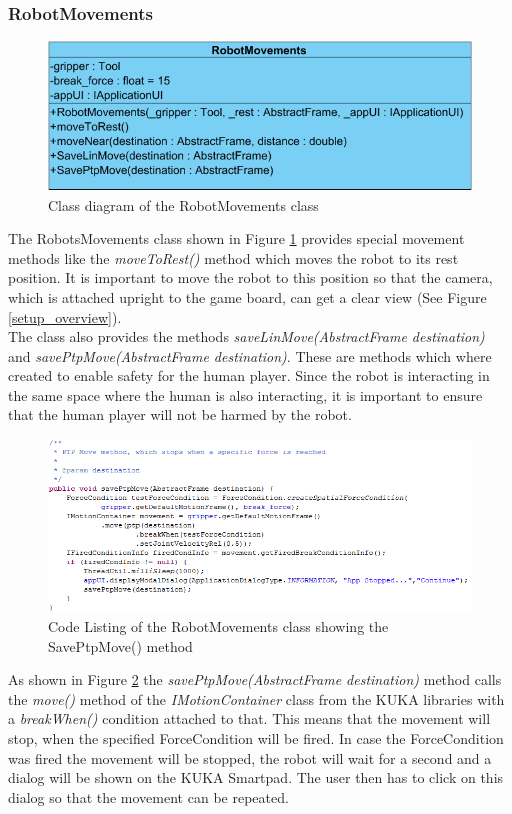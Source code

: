 \documentclass[a4paper]{spie}  %
\begin{document}
\begin{large}
\subsubsection{RobotMovements}
\begin{figure}[h]
\includegraphics[width=12cm]{images/class_roboMov.png}
\centering
\caption{Class diagram of the RobotMovements class}
\label{class_roboMov}
\end{figure}
The RobotsMovements class shown in Figure \ref{class_roboMov} provides special movement methods like the \emph{moveToRest()} method which moves the robot to its rest position. It is important to move the robot to this position so that the camera, which is attached upright to the game board, can get a clear view (See Figure \ref{setup_overview}). \\
The class also provides the methods \emph{saveLinMove(AbstractFrame destination)} and \emph{savePtpMove(AbstractFrame destination)}. These are methods which where  created to enable safety for the human player. Since the robot is interacting in the same space where the human is also interacting, it is important to ensure that the human player will not be harmed by the robot. \\
\begin{figure}[h]
\includegraphics[width=18cm]{images/code_safety.png}
\centering
\caption{Code Listing of the RobotMovements class showing the SavePtpMove() method}
\label{code_safety}
\end{figure}
As shown in Figure \ref{code_safety} the \emph{savePtpMove(AbstractFrame destination)} method calls the \emph{move()} method of the \emph{IMotionContainer} class from the KUKA libraries with a \textit{breakWhen()} condition attached to that. This means that the movement will stop, when the specified ForceCondition will be fired. In case the ForceCondition was fired the movement will be stopped, the robot will wait for a second and a dialog will be shown on the KUKA Smartpad. The user then has to click on this dialog so that the movement can be repeated.

\end{large}
\end{document}
